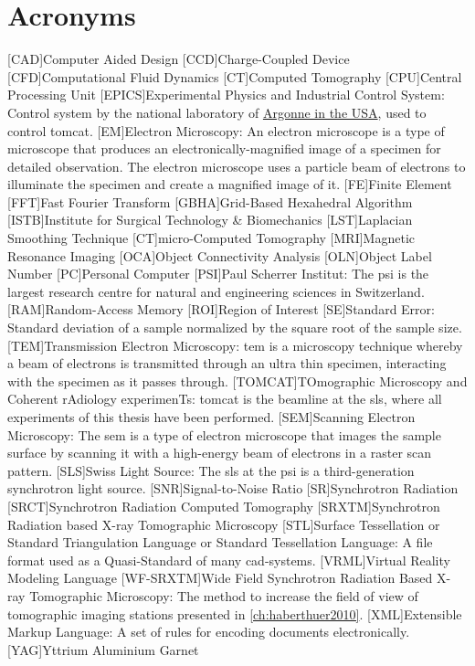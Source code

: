     \chapter*{Acronyms}
	\begin{acronym}[WF-SRXTM]
		[CAD]{Computer Aided Design}
		[CCD]{Charge-Coupled Device}
		[CFD]{Computational Fluid Dynamics}
		[CT]{Computed Tomography}
		[CPU]{Central Processing Unit}
		[EPICS]{Experimental Physics and Industrial Control System}: Control system by the national laboratory of \href{http://www.aps.anl.gov/epics/}{Argonne in the USA}, used to control \acs{tomcat}.
		[EM]{Electron Microscopy}: An electron microscope is a type of microscope that produces an electronically-magnified image of a specimen for detailed observation. The electron microscope uses a particle beam of electrons to illuminate the specimen and create a magnified image of it.
		[FE]{Finite Element}
		[FFT]{Fast Fourier Transform}
		{Grid-Based Hexahedral Algorithm}
		{Institute for Surgical Technology \& Biomechanics}
		[LST]{Laplacian Smoothing Technique}
		[\micro CT]{micro-Computed Tomography}
		[MRI]{Magnetic Resonance Imaging}
		[OCA]{Object Connectivity Analysis}
		[OLN]{Object Label Number}
		[PC]{Personal Computer}
		[PSI]{Paul Scherrer Institut}: The \acs{psi} is the largest research centre for natural and engineering sciences in Switzerland.
		[RAM]{Random-Access Memory}
		[ROI]{Region of Interest}
		[SE]{Standard Error}: Standard deviation of a sample normalized by the square root of the sample size.
		[TEM]{Transmission Electron Microscopy}: \ac{tem} is a microscopy  technique whereby a beam of electrons is transmitted through an ultra thin specimen, interacting with the specimen as it passes through.
		[TOMCAT]{TOmographic Microscopy and Coherent rAdiology experimenTs}: \acs{tomcat} is the beamline at the \acs{sls}, where all experiments of this thesis have been performed.
		[SEM]{Scanning Electron Microscopy}: The \ac{sem} is a type of electron microscope that images the sample surface by scanning it with a high-energy beam of electrons in a raster scan pattern.
		[SLS]{Swiss Light Source}: The \acs{sls} at the \acs{psi} is a third-generation synchrotron light source.
		[SNR]{Signal-to-Noise Ratio}
		[SR]{Synchrotron Radiation}
		{Synchrotron Radiation Computed Tomography}
		[SRXTM]{Synchrotron Radiation based X-ray Tomographic Microscopy}
		[STL]{Surface Tessellation or Standard Triangulation Language or Standard Tessellation Language}: A file format used as a Quasi-Standard of many \acs{cad}-systems.
		{Virtual Reality Modeling Language}
		[WF-SRXTM]{Wide Field Synchrotron Radiation Based X-ray Tomographic Microscopy}: The method to increase the field of view of tomographic imaging stations presented in \autoref{ch:haberthuer2010}.
		[XML]{Extensible Markup Language}: A set of rules for encoding documents electronically.
		[YAG]{Yttrium Aluminium Garnet}
	\end{acronym}
\endgroup

\cleardoublepage